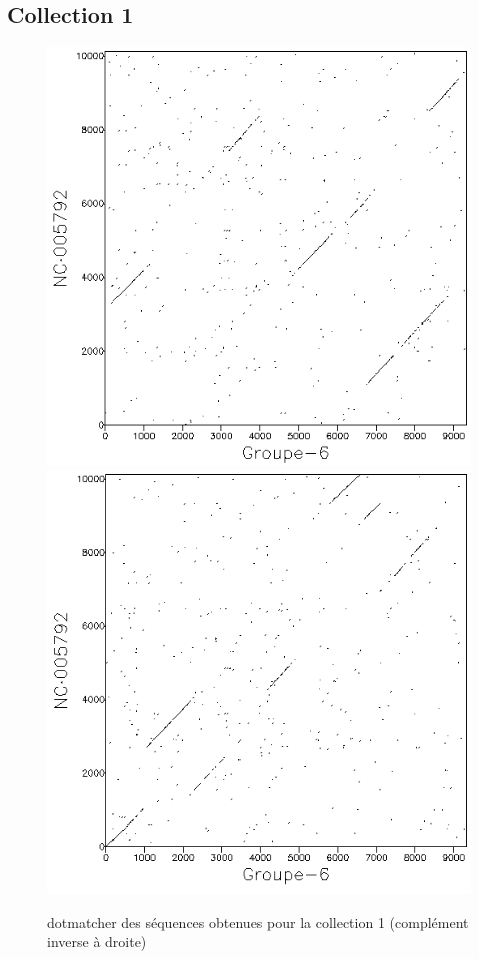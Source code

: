 \documentclass[11pt]{article}
\begin{document}
\subsection*{Collection 1}
\begin{figure}[H]
\centering
\includegraphics[scale=.55]{10000.png}
\includegraphics[scale=.55]{10000ic.png}
\caption{dotmatcher des séquences obtenues pour la collection 1 (complément inverse à droite)}
\end{figure}
\end{document}
